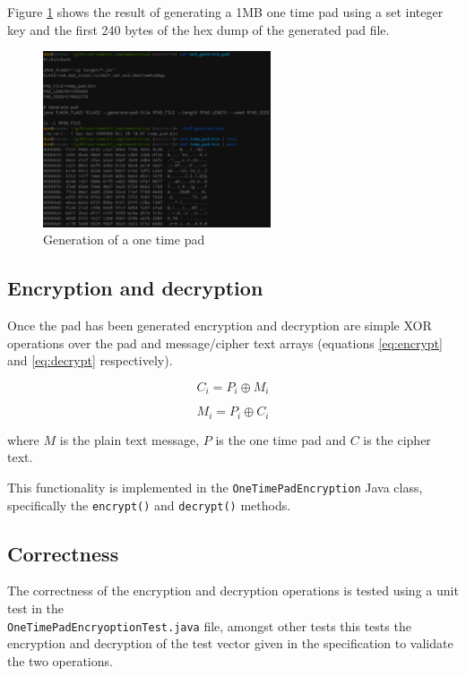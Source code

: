 \documentclass[a4paper]{article}
\begin{document}
Figure \ref{fig:generate_pad} shows the result of generating a 1MB one time pad
using a set integer key and the first 240 bytes of the hex dump of the generated
pad file.

\begin{figure}[h!]
  \centering
  \includegraphics[width=0.6\textwidth]{graphics/ex3_pad_generation.eps}
  \caption{Generation of a one time pad}
  \label{fig:generate_pad}
\end{figure}

\subsection{Encryption and decryption}

Once the pad has been generated encryption and decryption are simple XOR
operations over the pad and message/cipher text arrays (equations
\ref{eq:encrypt} and \ref{eq:decrypt} respectively).

\begin{equation}
  C_{i} = P_{i} \oplus M_{i}
  \label{eq:encrypt}
\end{equation}
\FloatBarrier

\begin{equation}
  M_{i} = P_{i} \oplus C_{i}
  \label{eq:decrypt}
\end{equation}
\FloatBarrier

where $M$ is the plain text message, $P$ is the one time pad and $C$ is the
cipher text.

This functionality is implemented in the \texttt{OneTimePadEncryption} Java
class, specifically the \texttt{encrypt()} and \texttt{decrypt()} methods.

\subsection{Correctness}

The correctness of the encryption and decryption operations is tested using a
unit test in the \\ \texttt{OneTimePadEncryoptionTest.java} file, amongst other
tests this tests the encryption and decryption of the test vector given in the
specification to validate the two operations.
\end{document}
